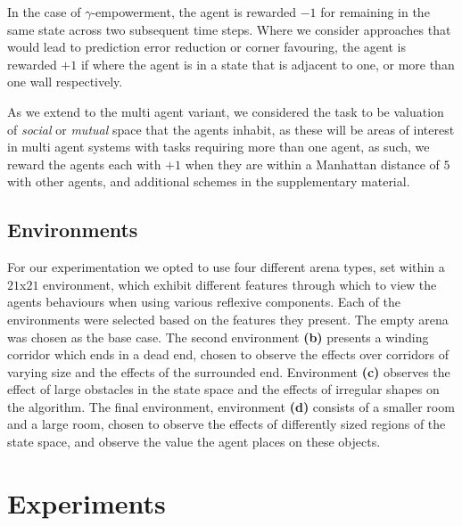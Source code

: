 \documentclass{article}
\begin{document}
In the case of $\gamma$-empowerment, the agent is rewarded $-1$ for remaining in the same state across two subsequent time steps. Where we consider approaches that would lead to prediction error reduction or corner favouring, the agent is rewarded $+1$ if where the agent is in a state that is adjacent to one, or more than one wall respectively.

As we extend to the multi agent variant, we considered the task to be valuation of \emph{social} or \emph{mutual} space that the agents inhabit, as these will be areas of interest in multi agent systems with tasks requiring more than one agent, as such, we reward the agents each with $+1$ when they are within a Manhattan distance of $5$ with other agents, and additional schemes in the supplementary material.

\subsection{Environments}

For our experimentation we opted to use four different arena types, set within a $21$x$21$ environment, which exhibit different features through which to view the agents behaviours when using various reflexive components.%
Each of the environments were selected based on the features they present. The empty arena was chosen as the base case. The second environment \textbf{(b)} presents a winding corridor which ends in a dead end, chosen to observe the effects over corridors of varying size and the effects of the surrounded end. Environment \textbf{(c)} observes the effect of large obstacles in the state space and the effects of irregular shapes on the algorithm. The final environment, environment \textbf{(d)} consists of a smaller room and a large room, chosen to observe the effects of differently sized regions of the state space, and observe the value the agent places on these objects. 

\section{Experiments\label{Results}}

\end{document}
